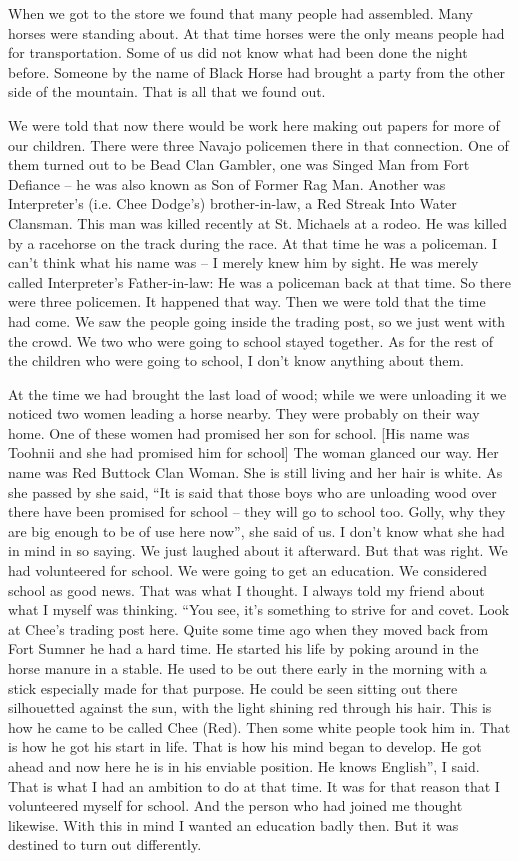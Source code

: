 When we got to the store we found that many people had assembled. Many horses were standing about. At that time horses were the only means people had for transportation. Some of us did not know what had been done the night before. Someone by the name of Black Horse had brought a party from the other side of the mountain. That is all that we found out.

We were told that now there would be work here making out papers for more of our children. There were three Navajo policemen there in that connection. One of them turned out to be Bead Clan Gambler, one was Singed Man from Fort Defiance -- he was also known as Son of Former Rag Man. Another was Interpreter's (i.e. Chee Dodge's) brother-in-law, a Red Streak Into Water Clansman. This man was killed recently at St. Michaels at a rodeo. He was killed by a racehorse on the track during the race. At that time he was a policeman. I can't think what his name was -- I merely knew him by sight. He was merely called Interpreter's Father-in-law: He was a policeman back at that time. So there were three policemen. It happened that way. Then we were told that the time had come. We saw the people going inside the trading post, so we just went with the crowd. We two who were going to school stayed together. As for the rest of the children who were going to school, I don't know anything about them.

At the time we had brought the last load of wood; while we were unloading it we noticed two women leading a horse nearby. They were probably on their way home. One of these women had promised her son for school. [His name was Toohnii and she had promised him for school] The woman glanced our way. Her name was Red Buttock Clan Woman. She is still living and her hair is white. As she passed by she said, ``It is said that those boys who are unloading wood over there have been promised for school -- they will go to school too. Golly, why they are big enough to be of use here now'', she said of us. I don't know what she had in mind in so saying. We just laughed about it afterward. But that was right. We had volunteered for school. We were going to get an education. We considered school as good news. That was what I thought. I always told my friend about what I myself was thinking. ``You see, it's something to strive for and covet. Look at Chee's trading post here. Quite some time ago when they moved back from Fort Sumner he had a hard time. He started his life by poking around in the horse manure in a stable. He used to be out there early in the morning with a stick especially made for that purpose. He could be seen sitting out there silhouetted against the sun, with the light shining red through his hair. This is how he came to be called Chee (Red). Then some white people took him in. That is how he got his start in life. That is how his mind began to develop. He got ahead and now here he is in his enviable position. He knows English'', I said. That is what I had an ambition to do at that time. It was for that reason that I volunteered myself for school. And the person who had joined me thought likewise. With this in mind I wanted an education badly then. But it was destined to turn out differently.


